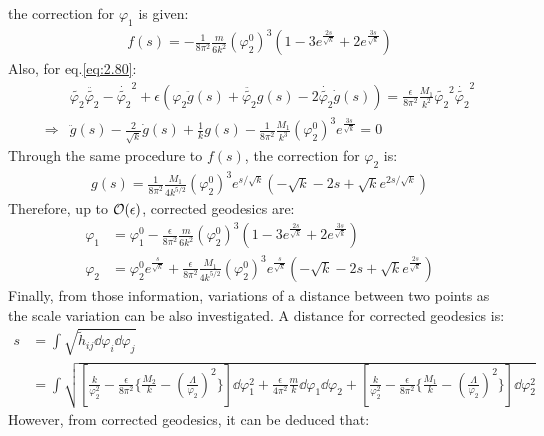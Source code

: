 the correction for $\varphi_{1}$ is given:
\begin{align}
    f(s) = -\frac{1}{8\pi^{2}}\frac{m}{6k^{2}}(\varphi_{2}^{0})^{3}(1-3e^{\frac{2s}{\sqrt{k}}} + 2e^{\frac{3s}{\sqrt{k}}})
\end{align}
Also, for eq.\ref{eq:2.80}:
\begin{align}
    &\tilde{\varphi_{2}}\ddot{\tilde{\varphi_{2}}} -\dot{\tilde{\varphi_{2}}}^{2} + \epsilon(\varphi_{2}\ddot{g}(s) + \ddot{\tilde{\varphi_{2}}} g(s) - 2\dot{\tilde{\varphi_{2}}}\dot{g}(s)) = \frac{\epsilon}{8\pi^{2}}\frac{M_1}{k^2} \tilde{\varphi_{2}}^2 \dot{\tilde{\varphi_{2}}}^2 \\
    \Rightarrow & \ddot{g}(s) - \frac{2}{\sqrt{k}} \dot{g}(s) +\frac{1}{k}g(s) - \frac{1}{8\pi^{2}}\frac{M_{1}}{k^3} (\varphi_{2}^{0})^{3} e^{\frac{3s}{\sqrt{k}} }= 0
\end{align}
Through the same procedure to $f(s)$, the correction for $\varphi_{2}$ is:
\begin{align}
    g(s) = \frac{1}{8\pi^{2}} \frac{M_{1}}{4k^{5/2}}(\varphi_{2}^{0})^{3}e^{s/\sqrt{k}} (-\sqrt{k} - 2s +\sqrt{k} e^{2s/\sqrt{k}})
\end{align}
Therefore, up to $\order {\epsilon}$, corrected geodesics are:
\begin{align}[left=\empheqlbrace]
    \varphi_{1} &= \varphi_{1}^{0} - \frac{\epsilon}{8\pi^2} \frac{m}{6k^{2}} (\varphi_{2}^{0})^{3} (1-3e^{\frac{2s}{\sqrt{k}}} + 2e^{\frac{3s}{\sqrt{k}}}) \\
     \varphi_{2} &= \varphi_{2}^{0} e^{\frac{s}{\sqrt{k}}} + \frac{\epsilon}{8\pi^{2}}\frac{M_{1}}{4k^{5/2}} (\varphi_{2}^{0})^{3} e^{\frac{s}{\sqrt{k}}} (-\sqrt{k} - 2s + \sqrt{k} e^{\frac{2s}{\sqrt{k}}})
\end{align}
Finally, from those information, variations of a distance between two points as the scale variation can be also investigated. A distance for corrected geodesics is:
\begin{align}
    s &= \int \sqrt{\tilde h_{ij} \dd \varphi_{i} \dd \varphi_{j}} \nonumber \\
    &= \int \sqrt{[\frac{k}{\varphi_{2}^{2}} -\frac{\epsilon}{8\pi^{2}}\lbrace \frac{M_2}{k} - (\frac{\Lambda}{\varphi_{2}})^{2}\rbrace ]\dd \varphi_{1}^{2} + \frac{\epsilon}{4\pi^{2}} \frac{m}{k}\dd \varphi_{1} \dd \varphi_{2} +[\frac{k}{\varphi_{2}^{2}} -\frac{\epsilon}{8\pi^{2}}\lbrace \frac{M_1}{k} - (\frac{\Lambda}{\varphi_{2}})^{2}\rbrace ] \dd \varphi_{2}^{2} } \nonumber
\end{align}
However, from corrected geodesics, it can be deduced that:
